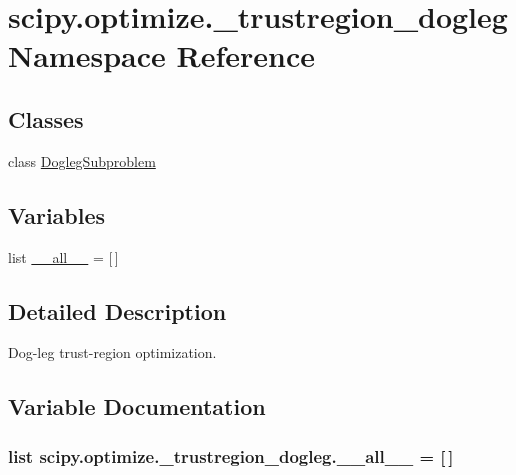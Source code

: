 \hypertarget{namespacescipy_1_1optimize_1_1__trustregion__dogleg}{}\section{scipy.\+optimize.\+\_\+trustregion\+\_\+dogleg Namespace Reference}
\label{namespacescipy_1_1optimize_1_1__trustregion__dogleg}
\subsection*{Classes}
\begin{DoxyCompactItemize}
\item 
class \hyperlink{classscipy_1_1optimize_1_1__trustregion__dogleg_1_1DoglegSubproblem}{Dogleg\+Subproblem}
\end{DoxyCompactItemize}
\subsection*{Variables}
\begin{DoxyCompactItemize}
\item 
list \hyperlink{namespacescipy_1_1optimize_1_1__trustregion__dogleg_a19aa3e5614fc328e9856d2fca4699efc}{\+\_\+\+\_\+all\+\_\+\+\_\+} = \mbox{[}$\,$\mbox{]}
\end{DoxyCompactItemize}


\subsection{Detailed Description}
\begin{DoxyVerb}Dog-leg trust-region optimization.\end{DoxyVerb}
 

\subsection{Variable Documentation}
\hypertarget{namespacescipy_1_1optimize_1_1__trustregion__dogleg_a19aa3e5614fc328e9856d2fca4699efc}{}
\subsubsection[{\+\_\+\+\_\+all\+\_\+\+\_\+}]{\setlength{\rightskip}{0pt plus 5cm}list scipy.\+optimize.\+\_\+trustregion\+\_\+dogleg.\+\_\+\+\_\+all\+\_\+\+\_\+ = \mbox{[}$\,$\mbox{]}}\label{namespacescipy_1_1optimize_1_1__trustregion__dogleg_a19aa3e5614fc328e9856d2fca4699efc}
